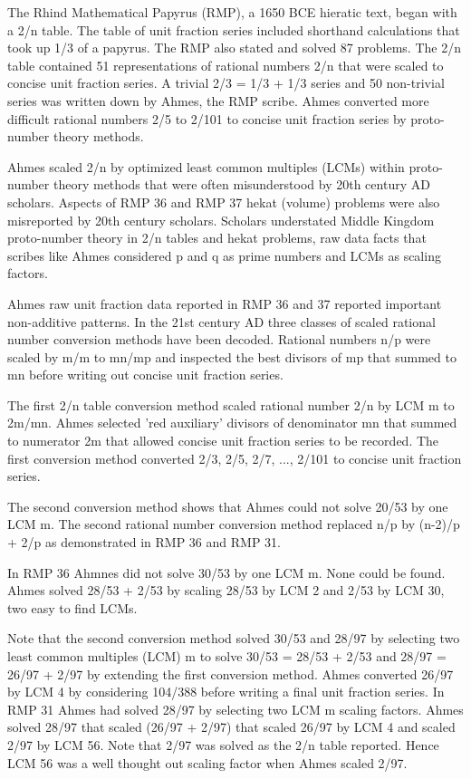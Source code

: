 \documentclass[12pt]{article}
\begin{document}
The Rhind Mathematical Papyrus (RMP), a 1650 BCE hieratic text, began with a 2/n table.  The table of unit fraction series included shorthand calculations that took up 1/3 of a papyrus. The RMP also stated and solved 87 problems. The 2/n table contained 51 representations of rational numbers 2/n that were scaled to concise unit fraction series. A trivial 2/3 = 1/3 + 1/3 series and 50 non-trivial series was written down by Ahmes, the RMP scribe. Ahmes converted more difficult rational numbers 2/5 to 2/101 to concise unit fraction series by proto-number theory methods.  

Ahmes scaled 2/n by optimized least common multiples (LCMs) within proto-number theory methods that were often misunderstood by 20th century AD scholars. Aspects of RMP 36 and RMP 37 hekat (volume) problems were also misreported by 20th century scholars. Scholars understated Middle Kingdom proto-number theory in 2/n tables and hekat problems, raw data facts that scribes like Ahmes considered p and q as prime numbers and LCMs as scaling factors. 

Ahmes raw unit fraction data reported in RMP 36 and 37 reported important non-additive patterns. In the 21st century AD three classes of scaled rational number conversion methods have been decoded.  Rational numbers n/p were scaled by m/m to mn/mp and inspected the best divisors of mp that summed to mn before writing out concise unit fraction series.  

The first 2/n table conversion method scaled rational number 2/n by LCM m to 2m/mn. Ahmes selected 'red auxiliary' divisors of denominator mn that summed to numerator 2m that allowed concise unit fraction series to be recorded. The first conversion method converted 2/3, 2/5, 2/7, ..., 2/101 to concise unit fraction series.

The second conversion method shows that Ahmes could not solve 20/53 by one LCM m. The second rational number conversion method replaced n/p by (n-2)/p + 2/p as demonstrated in RMP 36 and RMP 31.

In RMP 36 Ahmnes did not solve 30/53 by one LCM m. None could be found. Ahmes solved 28/53 + 2/53 by scaling 28/53 by LCM 2 and 2/53 by LCM 30, two easy to find LCMs. 

Note that the second conversion method solved 30/53 and 28/97 by selecting two least common multiples (LCM) m to solve 30/53 = 28/53 + 2/53 and 28/97 = 26/97 + 2/97 by extending the first conversion method. Ahmes converted 26/97 by LCM 4 by considering 104/388 before writing a final unit fraction series.  In RMP 31 Ahmes had solved 28/97 by selecting two LCM m scaling factors. Ahmes solved 28/97 that scaled (26/97 + 2/97) that scaled 26/97 by LCM 4 and scaled 2/97 by LCM 56. Note that 2/97 was solved as the 2/n table reported. Hence LCM 56 was a well thought out scaling factor when Ahmes scaled 2/97.
\end{document}
